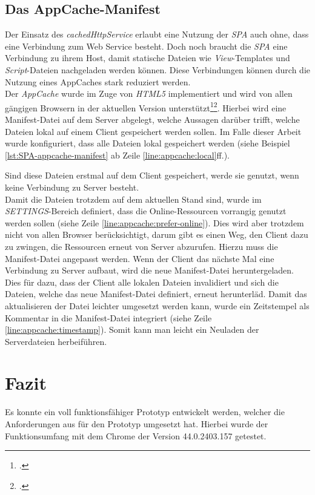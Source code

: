 \subsection{Das AppCache-Manifest}
\label{ssec:appcache-manifest}
Der Einsatz des \textit{cachedHttpService} erlaubt eine Nutzung der \textit{SPA} auch ohne, dass eine Verbindung zum Web Service besteht. Doch noch braucht die \textit{SPA} eine Verbindung zu ihrem Host, damit statische Dateien wie \textit{View}-Templates und \textit{Script}-Dateien nachgeladen werden können. Diese Verbindungen können durch die Nutzung eines AppCaches stark reduziert werden. \\
Der \textit{AppCache} wurde im Zuge von \textit{HTML5} implementiert und wird von allen gängigen Browsern in der aktuellen Version unterstützt\footcite{online:AngularJs:indexedDB:w3c}\footcite{online:caniuse:appcache}. Hierbei wird eine Manifest-Datei auf dem Server abgelegt, welche Aussagen darüber trifft, welche Dateien lokal auf einem Client gespeichert werden sollen. Im Falle dieser Arbeit wurde konfiguriert, dass alle Dateien lokal gespeichert werden (siehe Beispiel \ref{lst:SPA-appcache-manifest} ab Zeile \ref{line:appcache:local}ff.). 



Sind diese Dateien erstmal auf dem Client gespeichert, werde sie genutzt, wenn keine Verbindung zu Server besteht. \\
Damit die Dateien trotzdem auf dem aktuellen Stand sind, wurde im \textit{SETTINGS}-Bereich definiert, dass die Online-Ressourcen vorrangig genutzt werden sollen (siehe Zeile \ref{line:appcache:prefer-online}). Dies wird aber trotzdem nicht von allen Browser berücksichtigt, darum gibt es einen Weg, den Client dazu zu zwingen, die Ressourcen erneut von Server abzurufen. Hierzu muss die Manifest-Datei angepasst werden. Wenn der Client das nächste Mal eine Verbindung zu Server aufbaut, wird die neue Manifest-Datei heruntergeladen. Dies für dazu, dass der Client alle lokalen Dateien invalidiert und sich die Dateien, welche das neue Manifest-Datei definiert, erneut herunterläd. Damit das aktualisieren der Datei leichter umgesetzt werden kann, wurde ein Zeitstempel als Kommentar in die Manifest-Datei integriert (siehe Zeile \ref{line:appcache:timestamp}). Somit kann man leicht ein Neuladen der Serverdateien herbeiführen. 
\section{Fazit}
Es konnte ein voll funktionsfähiger Prototyp entwickelt werden, welcher die Anforderungen aus für den Prototyp umgesetzt hat. Hierbei wurde der Funktionsumfang mit dem Chrome der Version 44.0.2403.157 getestet.

